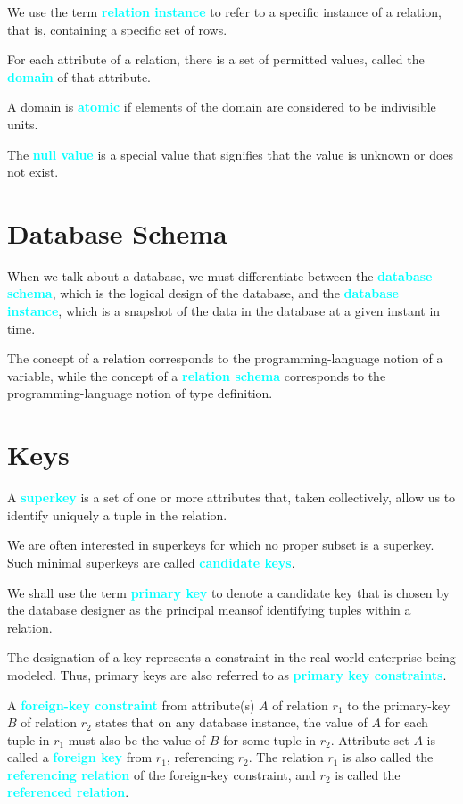 \documentclass{Beautybook-EN}
\newcommand{\textcy}[1]{\textbf{\textcolor{cyan}{#1}}}
\begin{document}
We use the term \textcy{relation instance} to refer to a specific instance of a relation, that is, containing a specific set of rows.

For each attribute of a relation, there is a set of permitted values, called the \textcy{domain} of that attribute.

A domain is \textcy{atomic} if elements of the domain are considered to be indivisible units.

The \textcy{null value} is a special value that signifies that the value is unknown or does not exist.

\section{Database Schema}

When we talk about a database, we must differentiate between the \textcy{database schema}, which is the logical design of the database, and the \textcy{database instance}, which is a snapshot of the data in the database at a given instant in time.

The concept of a relation corresponds to the programming-language notion of a variable, while the concept of a \textcy{relation schema} corresponds to the programming-language notion of type definition.

\section{Keys}

A \textcy{superkey} is a set of one or more attributes that, taken collectively, allow us to identify uniquely a tuple in the relation.

We are often interested in superkeys for which no proper subset is a superkey. Such minimal superkeys are called \textcy{candidate keys}.

We shall use the term \textcy{primary key} to denote a candidate key that is chosen by the database designer as the principal meansof identifying tuples within a relation.

The designation of a key represents a constraint in the real-world enterprise being modeled. Thus, primary keys are also referred to as \textcy{primary key constraints}.

A \textcy{foreign-key constraint} from attribute(s) $A$ of relation $r_1$ to the primary-key $B$ of relation $r_2$ states that on any database instance, the value of $A$ for each tuple in $r_1$ must also be the value of $B$ for some tuple in $r_2$. Attribute set $A$ is called a \textcy{foreign key} from $r_1$, referencing $r_2$. The relation $r_1$ is also called the \textcy{referencing relation} of the foreign-key constraint, and $r_2$ is called the \textcy{referenced relation}.
\end{document}
